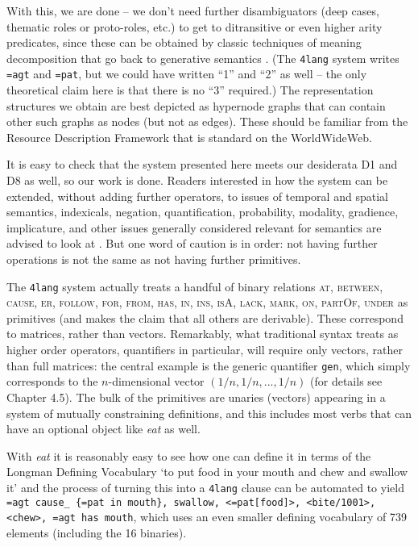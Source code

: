 \documentclass[output=paper]{langscibook}
\begin{document}
With this, we are done -- we don't need further disambiguators (deep cases,
thematic roles or proto-roles, etc.) to get to ditransitive or even higher
arity predicates, since these can be obtained by classic techniques of meaning
decomposition that go back to generative semantics \citep{Kornai:2012}.  (The
\texttt{4lang} system writes \texttt{=agt} and \texttt{=pat}, but we could have
written ``1'' and ``2'' as well -- the only theoretical claim here is that there
is no ``3'' required.) The representation structures we obtain are best depicted
as hypernode graphs that can contain other such graphs as nodes (but not as
edges). These should be familiar from the Resource Description Framework that is standard on the WorldWideWeb.

It is easy to check that the system presented here meets our
desiderata D1 and D8 as well, so our work is done. Readers interested in how the
system can be extended, without adding further operators, to issues of
temporal and spatial semantics, indexicals, negation, quantification,
probability, modality, gradience, implicature, and other issues generally
considered relevant for semantics are advised to look at
\citet{Kornai:2022}. But one word of caution is in order: not having further
operations is not the same as not having further primitives.

The \texttt{4lang} system actually treats a handful of binary relations \textsc{at, between, cause, er, follow, for, from, has, in, ins, isA, lack, mark, on, partOf, under} as primitives (and makes the claim that all others are
derivable). These correspond to matrices, rather than vectors. Remarkably,
what traditional syntax treats as higher order operators, quantifiers in
particular, will require only vectors, rather than full matrices: the central
example is the generic quantifier \texttt{gen}, which simply corresponds to the
$n$-dimensional vector $(1/n,1/n,...,1/n)$ (for details see
\citet{Kornai:2022} Chapter 4.5). The bulk of the primitives are unaries (vectors)
appearing in a system of mutually constraining definitions, and this includes
most verbs that can have an optional object like \textit{eat} as well.

With \textit{eat} it is reasonably easy to see how one can define it in terms of
the Longman Defining Vocabulary `to put food in your mouth and chew and
swallow it' and the process of turning this into a \texttt{4lang} clause can be
automated \citep{Recski:2016d} to yield \texttt{=agt cause\_ \{=pat in mouth\},
  swallow, <=pat[food]>, <bite/1001>, <chew>, =agt has mouth}, which uses an
even smaller defining vocabulary of 739 elements (including the 16 binaries).
\end{document}
